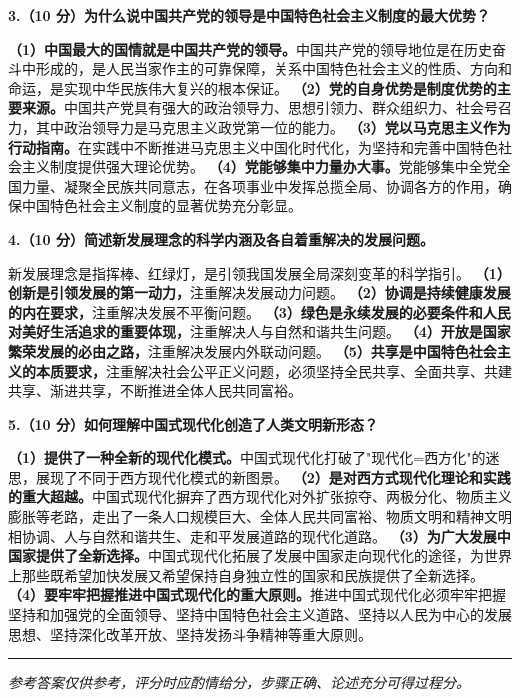 \documentclass[12pt, a4paper]{article}
\newcommand{\examrule}{\noindent\rule{\linewidth}{0.6pt}}
\begin{document}
\noindent\textbf{3.（10 分）为什么说中国共产党的领导是中国特色社会主义制度的最大优势？}
\begin{answerbox}
\textbf{（1）中国最大的国情就是中国共产党的领导。}中国共产党的领导地位是在历史奋斗中形成的，是人民当家作主的可靠保障，关系中国特色社会主义的性质、方向和命运，是实现中华民族伟大复兴的根本保证。
\textbf{（2）党的自身优势是制度优势的主要来源。}中国共产党具有强大的政治领导力、思想引领力、群众组织力、社会号召力，其中政治领导力是马克思主义政党第一位的能力。
\textbf{（3）党以马克思主义作为行动指南。}在实践中不断推进马克思主义中国化时代化，为坚持和完善中国特色社会主义制度提供强大理论优势。
\textbf{（4）党能够集中力量办大事。}党能够集中全党全国力量、凝聚全民族共同意志，在各项事业中发挥总揽全局、协调各方的作用，确保中国特色社会主义制度的显著优势充分彰显。
\end{answerbox}
\vspace{6pt}

\noindent\textbf{4.（10 分）简述新发展理念的科学内涵及各自着重解决的发展问题。}
\begin{answerbox}
新发展理念是指挥棒、红绿灯，是引领我国发展全局深刻变革的科学指引。
\textbf{（1）创新是引领发展的第一动力，}注重解决发展动力问题。
\textbf{（2）协调是持续健康发展的内在要求，}注重解决发展不平衡问题。
\textbf{（3）绿色是永续发展的必要条件和人民对美好生活追求的重要体现，}注重解决人与自然和谐共生问题。
\textbf{（4）开放是国家繁荣发展的必由之路，}注重解决发展内外联动问题。
\textbf{（5）共享是中国特色社会主义的本质要求，}注重解决社会公平正义问题，必须坚持全民共享、全面共享、共建共享、渐进共享，不断推进全体人民共同富裕。
\end{answerbox}
\vspace{6pt}

\noindent\textbf{5.（10 分）如何理解中国式现代化创造了人类文明新形态？}
\begin{answerbox}
\textbf{（1）提供了一种全新的现代化模式。}中国式现代化打破了"现代化=西方化"的迷思，展现了不同于西方现代化模式的新图景。
\textbf{（2）是对西方式现代化理论和实践的重大超越。}中国式现代化摒弃了西方现代化对外扩张掠夺、两极分化、物质主义膨胀等老路，走出了一条人口规模巨大、全体人民共同富裕、物质文明和精神文明相协调、人与自然和谐共生、走和平发展道路的现代化道路。
\textbf{（3）为广大发展中国家提供了全新选择。}中国式现代化拓展了发展中国家走向现代化的途径，为世界上那些既希望加快发展又希望保持自身独立性的国家和民族提供了全新选择。
\textbf{（4）要牢牢把握推进中国式现代化的重大原则。}推进中国式现代化必须牢牢把握坚持和加强党的全面领导、坚持中国特色社会主义道路、坚持以人民为中心的发展思想、坚持深化改革开放、坚持发扬斗争精神等重大原则。
\end{answerbox}
\vspace{12pt}
\examrule
\begin{center}
  \textit{参考答案仅供参考，评分时应酌情给分，步骤正确、论述充分可得过程分。}
\end{center}
\end{document}
